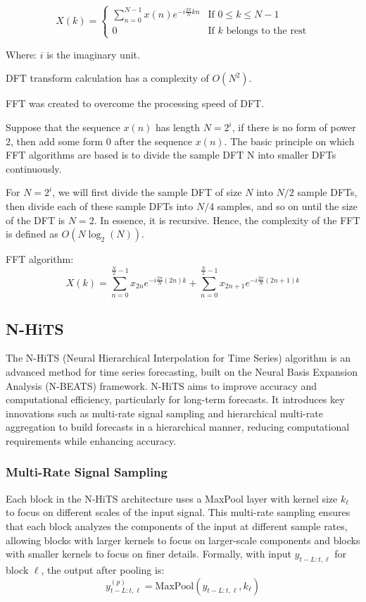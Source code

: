 \documentclass{ieeeojies}
\begin{document}
\[
X(k) = 
\begin{cases} 
\sum_{n=0}^{N-1} x(n) e^{-i \frac{2\pi}{N} kn} & \text{If } 0 \le k \le N-1 \\
0 & \text{If } k \text{ belongs to the rest}
\end{cases}
\]

Where: \( i \) is the imaginary unit.

DFT transform calculation has a complexity of \(O(N^2)\).

FFT was created to overcome the processing speed of DFT. 

Suppose that the sequence \(x(n)\) has length \( N = 2^i \), if there is no form of power 2, then add some form 0 after the sequence \(x(n)\). The basic principle on which FFT algorithms are based is to divide the sample DFT N into smaller DFTs continuously. 

For \( N = 2^i \), we will first divide the sample DFT of size \( N \) into \( N/2 \) sample DFTs, then divide each of these sample DFTs into \( N/4 \) samples, and so on until the size of the DFT is \( N = 2 \). In essence, it is recursive. Hence, the complexity of the FFT is defined as \( O(N \log_2(N)) \).

FFT algorithm: 
\[
X(k) = \sum_{n=0}^{\frac{N}{2}-1} x_{2n} e^{-i \frac{2\pi}{N} (2n) k} + \sum_{n=0}^{\frac{N}{2}-1} x_{2n+1} e^{-i \frac{2\pi}{N} (2n+1) k}
\]

\subsection{N-HiTS}
The N-HiTS (Neural Hierarchical Interpolation for Time Series) algorithm is an advanced method for time series forecasting, built on the Neural Basis Expansion Analysis (N-BEATS) framework. N-HiTS aims to improve accuracy and computational efficiency, particularly for long-term forecasts. It introduces key innovations such as multi-rate signal sampling and hierarchical multi-rate aggregation to build forecasts in a hierarchical manner, reducing computational requirements while enhancing accuracy.

\subsubsection{Multi-Rate Signal Sampling}

Each block in the N-HiTS architecture uses a MaxPool layer with kernel size \( k_\ell \) to focus on different scales of the input signal. This multi-rate sampling ensures that each block analyzes the components of the input at different sample rates, allowing blocks with larger kernels to focus on larger-scale components and blocks with smaller kernels to focus on finer details. Formally, with input \( y_{t-L:t,\ell} \) for block \( \ell \), the output after pooling is:
\[
y^{(p)}_{t-L:t,\ell} = \text{MaxPool}(y_{t-L:t,\ell}, k_\ell)
\]
\end{document}
